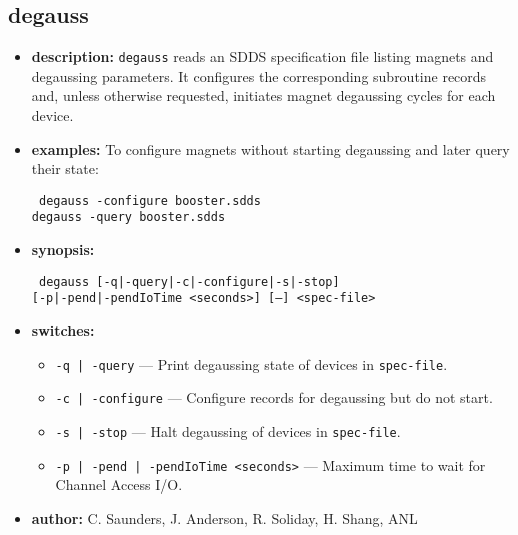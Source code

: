 \begin{latexonly}
\newpage
\end{latexonly}
\subsection{degauss}
\label{degauss}

\begin{itemize}
\item {\bf description:}
\verb+degauss+ reads an SDDS specification file listing magnets and degaussing parameters.
It configures the corresponding subroutine records and, unless otherwise requested, initiates
magnet degaussing cycles for each device.
\item {\bf examples:}
To configure magnets without starting degaussing and later query their state:
\begin{flushleft}{\tt
  degauss -configure booster.sdds\\
  degauss -query booster.sdds
}\end{flushleft}
\item {\bf synopsis:}
  \begin{flushleft}{\tt
    degauss [-q|-query|-c|-configure|-s|-stop]\\
    \phantom{degauss }[-p|-pend|-pendIoTime <seconds>] [--] <spec-file>
  }\end{flushleft}
\item {\bf switches:}
  \begin{itemize}
    \item {\tt -q\,|\,-query} --- Print degaussing state of devices in {\tt spec-file}.
    \item {\tt -c\,|\,-configure} --- Configure records for degaussing but do not start.
    \item {\tt -s\,|\,-stop} --- Halt degaussing of devices in {\tt spec-file}.
    \item {\tt -p\,|\,-pend\,|\,-pendIoTime <seconds>} --- Maximum time to wait for Channel Access I/O.
  \end{itemize}
\item {\bf author:} C. Saunders, J. Anderson, R. Soliday, H. Shang, ANL
\end{itemize}
